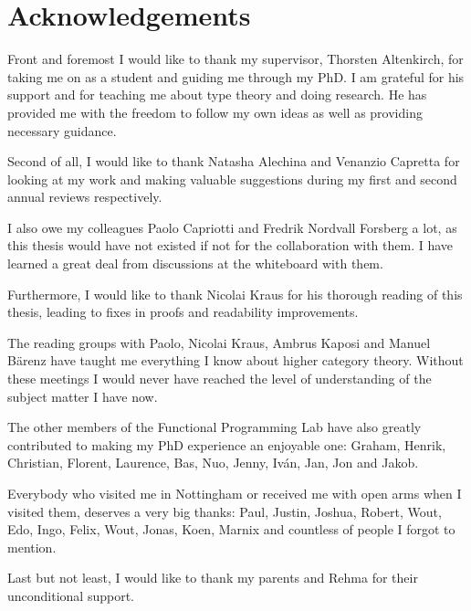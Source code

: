 \chapter*{Acknowledgements}

Front and foremost I would like to thank my supervisor, Thorsten
Altenkirch, for taking me on as a student and guiding me through my
PhD. I am grateful for his support and for teaching me about type
theory and doing research. He has provided me with the freedom to
follow my own ideas as well as providing necessary guidance.

Second of all, I would like to thank Natasha Alechina and Venanzio
Capretta for looking at my work and making valuable suggestions during
my first and second annual reviews respectively.

I also owe my colleagues Paolo Capriotti and Fredrik Nordvall Forsberg
a lot, as this thesis would have not existed if not for the
collaboration with them. I have learned a great deal from discussions
at the whiteboard with them.

Furthermore, I would like to thank Nicolai Kraus for his thorough
reading of this thesis, leading to fixes in proofs and readability
improvements.

The reading groups with Paolo, Nicolai Kraus, Ambrus Kaposi and Manuel
Bärenz have taught me everything I know about higher category
theory. Without these meetings I would never have reached the level of
understanding of the subject matter I have now.

The other members of the Functional Programming Lab have also greatly
contributed to making my PhD experience an enjoyable one: Graham,
Henrik, Christian, Florent, Laurence, Bas, Nuo, Jenny, Iv\'an, Jan,
Jon and Jakob.

Everybody who visited me in Nottingham or received me with open arms
when I visited them, deserves a very big thanks: Paul, Justin, Joshua,
Robert, Wout, Edo, Ingo, Felix, Wout, Jonas, Koen, Marnix and
countless of people I forgot to mention.

Last but not least, I would like to thank my parents and Rehma for
their unconditional support.
